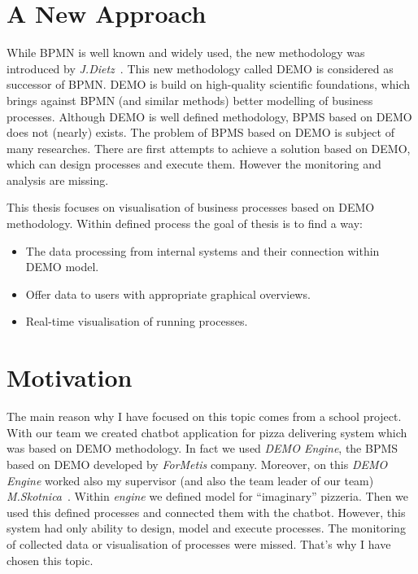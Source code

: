 \section{A New Approach}
While BPMN is well known and widely used, the new methodology was introduced by \textit{J.Dietz}~\cite{dietz-essence-2015}. This new methodology called DEMO is considered as successor of BPMN. DEMO is build on high-quality scientific foundations, which brings against BPMN (and similar methods) better modelling of business processes. Although DEMO is well defined methodology, BPMS based on DEMO does not (nearly) exists. The problem of BPMS based on DEMO is subject of many researches. There are first attempts to achieve a solution based on DEMO, which can design processes and execute them. However the monitoring and analysis are missing.

This thesis focuses on visualisation of business processes based on DEMO methodology. Within defined process the goal of thesis is to find a way:

\begin{itemize}
\item The data processing from internal systems and their connection within DEMO model. 
\item Offer data to users with appropriate graphical overviews.
\item Real-time visualisation of running processes.
\end{itemize}

\section{Motivation}
The main reason why I have focused on this topic comes from a school project. With our team we created chatbot application for pizza delivering system which was based on DEMO methodology. In fact we used \textit{DEMO Engine}, the BPMS based on DEMO developed by \textit{ForMetis} company. Moreover, on this \textit{DEMO Engine} worked also my supervisor (and also the team leader of our team) \textit{M.Skotnica}~\cite{diploma-skotnica-2016}. Within \textit{engine} we defined model for ``imaginary'' pizzeria. Then we used this defined processes and connected them with the chatbot. However, this system had only ability to design, model and execute processes. The monitoring of collected data or visualisation of processes were missed. That's why I have chosen this topic.

